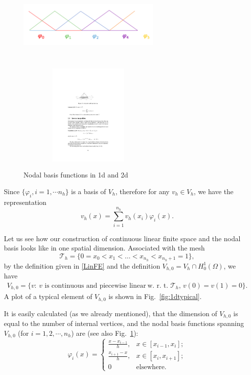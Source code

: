 %
\begin{figure}[hpt]
\centering
\includegraphics*[height=4.5cm,width=7cm]{figures/basisfunction}
\includegraphics[height=5cm,width=7cm]{figures/nodalbasis.pdf}
\caption{Nodal basis functions in 1d and 2d}
\label{fig:nodalbasis}
\end{figure}
Since $\{\varphi_i,i=1,\cdots n_h\}$ is a basis of $V_h$, therefore for any $v_h\in V_h$, we have the representation
$$
v_h(x)=\sum_{i=1}^{n_h}v_h(x_i)\varphi_i(x). 
$$

Let us see how our construction of continuous linear finite space and the nodal basis looks like  in one spatial dimension. 
Associated with the mesh
$$
\mathcal T_h=\{0=x_0<x_1<\ldots<x_{n_h}<x_{n_h+1}=1\},
$$
by the definition given in \eqref{LinFE} and the definition  $V_{h,0}=V_{h}\cap H_0^1(\Omega)$, we have
\[
\begin{array}{ll}
V_{h,0}=\{v:~\mbox{$v$ is continuous and piecewise linear}~ \mbox{w.~r.~t. $\mathcal T_h$, } v(0)=v(1)=0\}.
\end{array}
\]
A plot of a typical element of $V_{h,0}$ is shown in Fig.~\ref{fig:1dtypical}.

It is easily calculated (as we already mentioned), that the dimension
of $V_{h,0}$ is equal to the number of internal vertices, and the nodal
basis functions spanning $V_{h,0}$ (for $i=1,2,\cdots,n_h$) are (see also
Fig.~\ref{fig:nodalbasis}):
\begin{equation}\label{1dbasis:function}
\varphi_i(x)=\left\{\begin{array}{cl}
\displaystyle \frac{x-x_{i-1}}{h}, & x\in[x_{i-1},x_i];\\
\displaystyle \frac{x_{i+1}-x}{h}, & x\in[x_{i},x_{i+1}];\\
0 &\mbox{elsewhere}.
\end{array}\right.
\end{equation}

